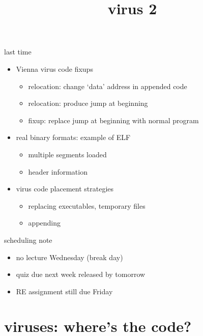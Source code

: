 \graphicspath{{./figures/}}
\title{virus 2}
\date{}
\usepackage{contour}

\begin{frame}
    \titlepage
\end{frame}



\begin{frame}{last time}
    \begin{itemize}
    \item Vienna virus code fixups
        \begin{itemize}
        \item relocation: change `data' address in appended code
        \item relocation: produce jump at beginning
        \item fixup: replace jump at beginning with normal program
        \end{itemize}
    \item real binary formats: example of ELF
        \begin{itemize}
        \item multiple segments loaded
        \item header information
        \end{itemize}
    \item virus code placement strategies
        \begin{itemize}
        \item replacing executables, temporary files
        \item appending
        \end{itemize}
    \end{itemize}
\end{frame}

\begin{frame}{scheduling note}
    \begin{itemize}
    \item no lecture Wednesday (break day)
    \item quiz due next week released by tomorrow
    \item RE assignment still due Friday
    \end{itemize}
\end{frame}


\section{viruses: where's the code?}

